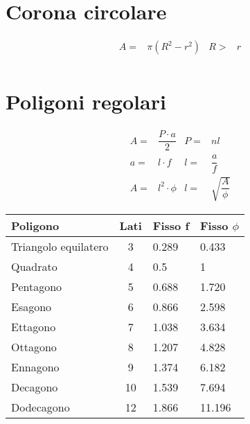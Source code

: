 \section{Corona circolare}
\begin{tcolorbox}[sidebyside,righthand width=9cm,colback=white,colframe=white,fonttitle=\bfseries	]
	
	\tcblower
	\begin{align*}
	A=&\pi(R^2-r^2) & R>&r\\
\end{align*}
\end{tcolorbox}
\section{Poligoni regolari}
\begin{tcolorbox}[sidebyside,righthand width=9cm,colback=white,colframe=white,fonttitle=\bfseries	]
	
	\tcblower
	\begin{align*}
	A=&\dfrac{P\cdot a}{2} & P=&nl	\\
	a=&l\cdot f & l=&\dfrac{a}{f}	\\
	A=&l^2\cdot\phi&l=&\sqrt{\dfrac{A}{\phi}}
	\end{align*}
\end{tcolorbox}
{\centering{}
	\begin{tabular}{lcll}
		\toprule
Poligono	&  Lati&  Fisso f&Fisso $\phi$ \\ 
\midrule
Triangolo equilatero	& 3 & 0.289 &0.433\\ 
Quadrato	& 4 & 0.5&1 \\ 
Pentagono	& 5 &0.688 &1.720 \\ 
Esagono	& 6 &0.866 &2.598 \\ 
Ettagono	& 7 &1.038&3.634 \\ 
Ottagono	& 8 &1.207&4.828 \\ 
Ennagono	& 9&  1.374&6.182\\ 
Decagono	& 10 & 1.539&7.694 \\ 
Dodecagono	&  12&  1.866&11.196\\
\bottomrule
\end{tabular}
\par}
